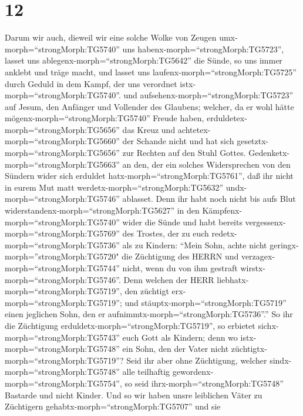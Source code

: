 \hypertarget{section-11}{%
\section{12}\label{section-11}}

 Darum wir auch, dieweil wir eine solche Wolke von Zeugen
umx-morph=``strongMorph:TG5740'' uns
habenx-morph=``strongMorph:TG5723'', lasset uns
ablegenx-morph=``strongMorph:TG5642'' die Sünde, so uns immer anklebt
und träge macht, und lasset uns laufenx-morph=``strongMorph:TG5725''
durch Geduld in dem Kampf, der uns verordnet
istx-morph=``strongMorph:TG5740''.  und
aufsehenx-morph=``strongMorph:TG5723'' auf Jesum, den Anfänger und
Vollender des Glaubens; welcher, da er wohl hätte
mögenx-morph=``strongMorph:TG5740'' Freude haben,
erduldetex-morph=``strongMorph:TG5656'' das Kreuz und
achtetex-morph=``strongMorph:TG5660'' der Schande nicht und hat sich
gesetztx-morph=``strongMorph:TG5656'' zur Rechten auf den Stuhl Gottes.
 Gedenketx-morph=``strongMorph:TG5663'' an den, der ein
solches Widersprechen von den Sündern wider sich erduldet
hatx-morph=``strongMorph:TG5761'', daß ihr nicht in eurem Mut matt
werdetx-morph=``strongMorph:TG5632'' undx-morph=``strongMorph:TG5746''
ablasset.  Denn ihr habt noch nicht bis aufs Blut
widerstandenx-morph=``strongMorph:TG5627'' in den
Kämpfenx-morph=``strongMorph:TG5740'' wider die Sünde  und
habt bereits vergessenx-morph=``strongMorph:TG5769'' des Trostes, der zu
euch redetx-morph=``strongMorph:TG5736'' als zu Kindern: ``Mein Sohn,
achte nicht geringx-morph=''strongMorph:TG5720" die Züchtigung des HERRN
und verzagex-morph=``strongMorph:TG5744'' nicht, wenn du von ihm
gestraft wirstx-morph=``strongMorph:TG5746''.  Denn welchen
der HERR liebhatx-morph=``strongMorph:TG5719'', den züchtigt
erx-morph=``strongMorph:TG5719''; und
stäuptx-morph=``strongMorph:TG5719'' einen jeglichen Sohn, den er
aufnimmtx-morph=``strongMorph:TG5736''.''  So ihr die
Züchtigung erduldetx-morph=``strongMorph:TG5719'', so erbietet
sichx-morph=``strongMorph:TG5743'' euch Gott als Kindern; denn wo
istx-morph=``strongMorph:TG5748'' ein Sohn, den der Vater nicht
züchtigtx-morph=``strongMorph:TG5719''?  Seid ihr aber ohne
Züchtigung, welcher sindx-morph=``strongMorph:TG5748'' alle teilhaftig
gewordenx-morph=``strongMorph:TG5754'', so seid
ihrx-morph=``strongMorph:TG5748'' Bastarde und nicht Kinder.
 Und so wir haben unsre leiblichen Väter zu Züchtigern
gehabtx-morph=``strongMorph:TG5707'' und sie
